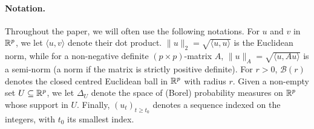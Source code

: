  
 \paragraph{Notation.}
 Throughout the paper, we will often use the following notations. For $u$ and $v$ in $\mathbb{R}^p$, we let $\langle u, v\rangle$ denote their dot product. $\|u\|_2 = \sqrt{\langle u, u\rangle}$ is the Euclidean norm, while for a non-negative definite $(p\times p)$-matrix $A$, $\|u\|_A = \sqrt{\langle u, Au\rangle}$ is a semi-norm (a norm if the matrix is strictly positive definite). For $r>0$, $\mathcal B(r)$ denotes the closed centred Euclidean ball in $\mathbb{R}^p$ with radius $r$. Given a non-empty set $U\subseteq\mathbb{R}^p$, we let $\Delta_U$ denote the space of (Borel) probability measures on $\mathbb{R}^p$ whose support in $U$. Finally, $(u_t)_{t\geq t_0}$ denotes a sequence indexed on the integers, with $t_0$ its smallest index. 
